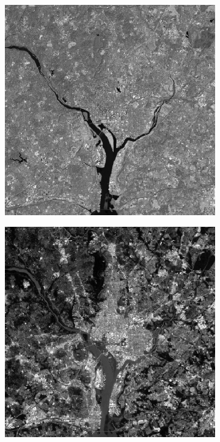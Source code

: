 \begin{figure}[h!]
\begin{subfigure}[b]{0.3\linewidth}
		\caption{}
		\label{fig:10reconstruct4}
	\end{subfigure}
	\begin{subfigure}[b]{0.3\linewidth}
		\includegraphics[width=\linewidth]{myfigure/p10/10_reconstruct_5.png}
		\caption{}
		\label{fig:10reconstruct5}
	\end{subfigure}
	\begin{subfigure}[b]{0.3\linewidth}
		\includegraphics[width=\linewidth]{myfigure/p10/10_reconstruct_6.png}
		\caption{}
		\label{fig:10reconstruct6}
	\end{subfigure}
	

\end{figure}
